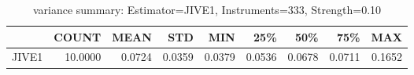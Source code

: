 \begin{table}[ht]
\centering
\caption{variance summary: Estimator=JIVE1, Instruments=333, Strength=0.10}
\begin{tabular}{lrrrrrrrr}
\toprule
 & COUNT & MEAN & STD & MIN & 25\% & 50\% & 75\% & MAX \\
\midrule
JIVE1 & 10.0000 & 0.0724 & 0.0359 & 0.0379 & 0.0536 & 0.0678 & 0.0711 & 0.1652 \\
\bottomrule
\end{tabular}
\end{table}
